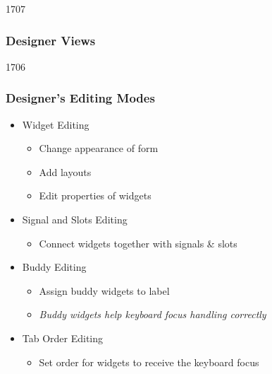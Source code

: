 \begin{slide}{1707}
\frametitle{Designer Views}
\end{slide}

\begin{slide}{1706}
\frametitle{Designer's Editing Modes}
  \begin{itemize}
  \item {} Widget Editing 
    \begin{itemize}
    \item Change appearance of form
    \item Add layouts
    \item Edit properties of widgets
    \end{itemize}
  \item {} Signal and Slots Editing 
    \begin{itemize}
    \item Connect widgets together with signals \& slots
    \end{itemize}
 \item {} Buddy Editing
   \begin{itemize}
   \item Assign buddy widgets to label
   \item \textit{Buddy widgets help keyboard focus handling correctly}
   \end{itemize}
  \item {} Tab Order Editing
    \begin{itemize}
    \item Set order for widgets to receive the keyboard focus
    \end{itemize}

 \end{itemize}  
\end{slide}

